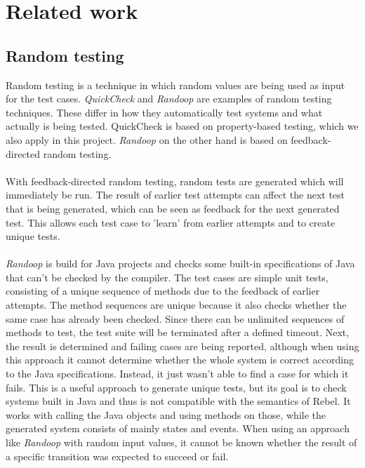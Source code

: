 \section{Related work}
\subsection{Random testing}
Random testing is a technique in which random values are being used as input for the test cases. \textit{QuickCheck} \cite{claessen2011quickcheck} and \textit{Randoop} \cite{pacheco2007randoop} are examples of random testing techniques. These differ in how they automatically test systems and what actually is being tested. QuickCheck is based on property-based testing, which we also apply in this project. \textit{Randoop} on the other hand is based on feedback-directed random testing.\\
\\
With feedback-directed random testing, random tests are generated which will immediately be run. The result of earlier test attempts can affect the next test that is being generated, which can be seen as feedback for the next generated test. This allows each test case to 'learn' from earlier attempts and to create unique tests.\\
\\
\textit{Randoop} is build for Java projects and checks some built-in specifications of Java that can't be checked by the compiler. The test cases are simple unit tests, consisting of a unique sequence of methods due to the feedback of earlier attempts. The method sequences are unique because it also checks whether the same case has already been checked. Since there can be unlimited sequences of methods to test, the test suite will be terminated after a defined timeout. Next, the result is determined and failing cases are being reported, although when using this approach it cannot determine whether the whole system is correct according to the Java specifications. Instead, it just wasn't able to find a case for which it fails. This is a useful approach to generate unique tests, but its goal is to check systems built in Java and thus is not compatible with the semantics of Rebel. It works with calling the Java objects and using methods on those, while the generated system consists of mainly states and events. When using an approach like \textit{Randoop} with random input values, it cannot be known whether the result of a specific transition was expected to succeed or fail.


